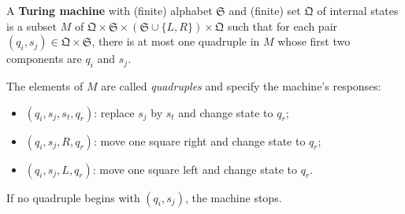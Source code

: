 A \textbf{Turing machine} with (finite) alphabet $\mathfrak{S}$ and (finite) set $\mathfrak{Q}$ of internal states is a subset $M$ of $\mathfrak{Q} \times \mathfrak{S} \times (\mathfrak{S} \cup \{L, R\}) \times \mathfrak{Q}$ such that for each pair $(q_i, s_j) \in \mathfrak{Q} \times \mathfrak{S}$, there is at most one quadruple in $M$ whose first two components are $q_i$ and $s_j$.

The elements of $M$ are called \textit{quadruples} and specify the machine's responses:
\begin{itemize}
\item $(q_i, s_j, s_t, q_r)$: replace $s_j$ by $s_t$ and change state to $q_r$;
\item $(q_i, s_j, R, q_r)$: move one square right and change state to $q_r$;
\item $(q_i, s_j, L, q_r)$: move one square left and change state to $q_r$.
\end{itemize}
If no quadruple begins with $(q_i, s_j)$, the machine stops.

